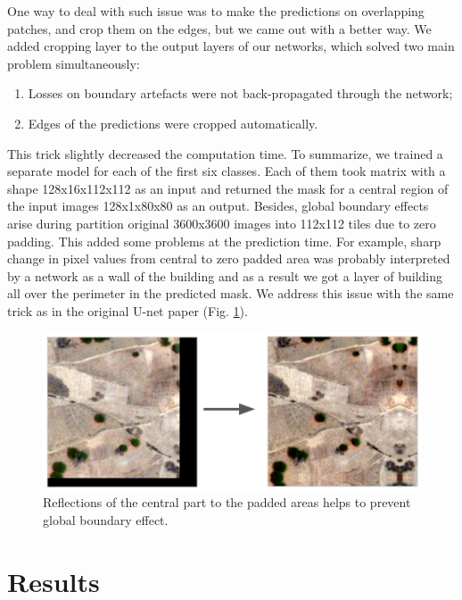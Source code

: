 \documentclass[10pt,twocolumn,letterpaper]{article}
\begin{document}
One way to deal with such issue was to make the predictions on overlapping patches, and crop them on the edges, but we came out with a better way. We added cropping layer to the output layers of our networks, which solved two main problem simultaneously:

\begin{enumerate}
	\item Losses on boundary artefacts were not back-propagated through the network;
	\item Edges of the predictions were cropped automatically.
\end{enumerate}

This trick slightly decreased the computation time. To summarize, we trained a separate model for each of the first six classes. Each of them took matrix with a shape 128x16x112x112 as an input and returned the mask for a central region of the input images 128x1x80x80 as an output. Besides, global boundary effects arise during partition original 3600x3600 images into 112x112 tiles due to zero padding. This added some problems at the prediction time. For example, sharp change in pixel values from central to zero padded area was probably interpreted by a network as a wall of the building and as a result we got a layer of building all over the perimeter in the predicted mask. We address this issue with the same trick as in the original U-net paper \cite{unet} (Fig. \ref{fig:boundary2}).

\begin{figure}[!h]
	\captionsetup{justification=centering}
	\centering
	\includegraphics[scale=0.21]{boundary2}
	\caption{Reflections of the central part to the padded areas helps to prevent global boundary effect.}
	\label{fig:boundary2}
\end{figure}


\section{Results}
\end{document}
